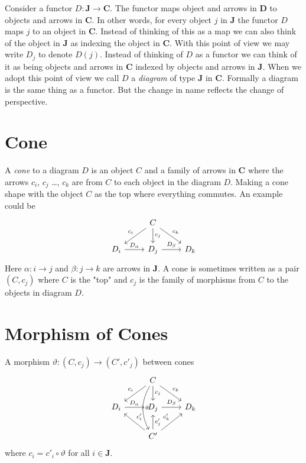 \documentclass{book}
\theoremstyle{definition}
\begin{document}
Consider a functor $D : \textbf{J} \to \textbf{C}$. The functor maps object and
arrows in \textbf{D} to objects and arrows in \textbf{C}. In other words, for
every object $j$ in \textbf{J} the functor $D$ maps $j$ to an object in
\textbf{C}. Instead of thinking of this as a map we can also think of the object
in \textbf{J} as indexing the object in \textbf{C}. With this point of view we
may write $D_{j}$ to denote $D(j)$. Instead of thinking of $D$ as a functor we
can think of it as being objects and arrows in \textbf{C} indexed by objects and
arrows in \textbf{J}. When we adopt this point of view we call $D$ a
\emph{diagram} of type \textbf{J} in \textbf{C}. Formally a diagram is the same
thing as a functor. But the change in name reflects the change of perspective.

\section{Cone}

A \emph{cone} to a diagram $D$ is an object $C$ and a family of arrows in
\textbf{C} where the arrows $c_i$, $c_j$ \dots, $c_k$ are from $C$ to each
object in the diagram $D$. Making a cone shape with the object $C$ as the top
where everything commutes. An example could be
\[
\begin{tikzcd}
  & C \arrow[dl, "c_i"'] \arrow[d, "c_j"] \arrow[dr, "c_k"]  \\
  D_i \arrow[r,"D_\alpha"] & D_j \arrow[r, "D_\beta"]  & D_k
\end{tikzcd}
\]
Here $\alpha : i \to j$ and $\beta : j \to k$ are arrows in \textbf{J}. A cone is sometimes
written as a pair $(C, c_j)$ where $C$ is the "top" and $c_j$ is the family of
morphisms from $C$ to the objects in diagram $D$.

\section{Morphism of Cones}

A morphism $\vartheta : (C, c_j) \to (C', c'_j)$ between cones
\[
\begin{tikzcd}
  & C \arrow[dl, "c_i"'] \arrow[d, "c_j"] \arrow[dr, "c_k"] \arrow[dd, "\vartheta", bend right] \\
  D_i \arrow[r,"D_\alpha"] & D_j \arrow[r, "D_\beta"]  & D_k \\
  & C' \arrow[ul, "c'_i"'] \arrow[u, "c'_j"'] \arrow[ur, "c'_k"]
\end{tikzcd}
\]
where $c_i = c'_i \circ \vartheta$ for all $i \in \textbf{J}$.
\end{document}
